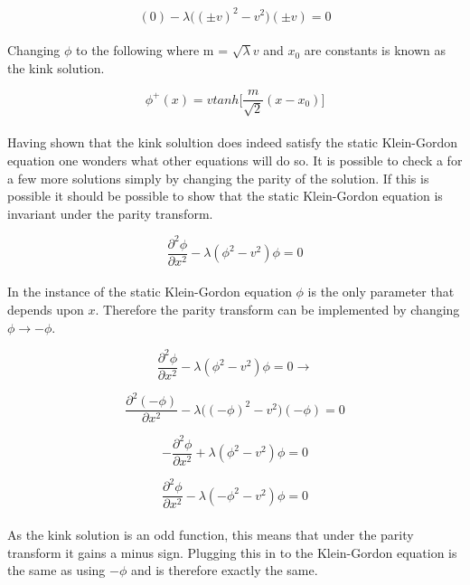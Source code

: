 $$
	(0) - \lambda \bigg((\pm v) ^{2} - v^{2} \bigg)(\pm v)
	= 0
$$

\paragraph{}
Changing $\phi$ to the following where m = $\sqrt{\lambda}v$ and $x_0$ are constants is known as the kink solution.

$$
	\phi^{+} (x) = v tanh \bigg[ \frac{m}{\sqrt{2}}(x - x_0) \bigg]
$$

\paragraph{}
Having shown that the kink solultion does indeed satisfy the static Klein-Gordon equation one wonders what other equations will do so.  It is possible to check a for a few more solutions simply by changing the parity of the solution.  If this is possible it should be possible to show that the static Klein-Gordon equation is invariant under the parity transform.

$$
	\frac{\partial ^2 \phi } {\partial x^2} - \lambda(\phi ^2 - v^2)\phi = 0
$$

\paragraph{}
In the instance of the static Klein-Gordon equation $\phi$ is the only parameter that depends upon $x$.  Therefore the parity transform can be implemented by changing $\phi \rightarrow -\phi$.

$$
	\frac{\partial ^2 \phi } {\partial x^2} - \lambda(\phi ^2 - v^2)\phi = 0
	\rightarrow
$$

$$
	\frac{\partial ^2 (-\phi) } {\partial x^2} - \lambda \bigg((-\phi) ^2 - v^2 \bigg)(-\phi) = 0
$$

$$
	-\frac{\partial ^2 \phi } {\partial x^2} + \lambda(\phi ^2 - v^2)\phi = 0
$$

$$
	\frac{\partial ^2 \phi } {\partial x^2} - \lambda(-\phi ^2 - v^2)\phi = 0
$$

\paragraph{}
As the kink solution is an odd function, this means that under the parity transform it gains a minus sign.  Plugging this in to the Klein-Gordon equation is the same as using $-\phi$ and is therefore exactly the same.


